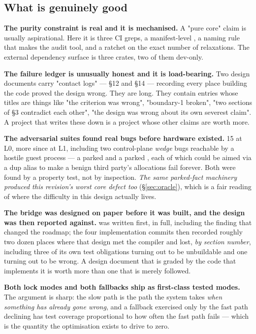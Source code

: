 \documentclass[10.5pt]{article}
\begin{document}
\subsection{What is genuinely good}

\textbf{The purity constraint is real and it is mechanised.} A "pure core" claim is usually
aspirational. Here it is three CI greps, a manifest-level , a naming rule that makes
 the audit tool, and a ratchet on the exact number of  relaxations. The
external dependency surface is three crates, two of them dev-only.

\textbf{The failure ledger is unusually honest and it is load-bearing.} Two design documents
carry "contact logs" —  \S12 and  \S14 — recording
every place building the code proved the design wrong. They are long. They contain entries whose
titles are things like "the criterion was wrong", "boundary-1 broken", "two sections of \S3
contradict each other", "the design was wrong about its own severest claim". A project that
writes these down is a project whose other claims are worth more.

\textbf{The adversarial suites found real bugs before hardware existed.} 15 at L0, more since at
L1, including two control-plane \emph{wedge} bugs reachable by a hostile guest process — a parked
 and a parked , each of which could be aimed
via a dup alias to make a benign third party's allocations fail forever. Both were found by a
property test, not by inspection. \emph{The same parked-fact machinery produced this revision's
worst core defect too} (\S\ref{sec:oracle}), which is a fair reading of where the difficulty in
this design actually lives.

\textbf{The bridge was designed on paper before it was built, and the design was then reported
against.}  was written first, in full, including the finding
that changed the roadmap; the four implementation commits then recorded roughly two dozen places where
that design met the compiler and lost, \emph{by section number}, including three of its own test
obligations turning out to be unbuildable and one turning out to be wrong. A design document that
is graded by the code that implements it is worth more than one that is merely followed.

\textbf{Both lock modes and both fallbacks ship as first-class tested modes.} The argument is
sharp: the slow path is the path the system takes \emph{when something has already gone wrong},
and a fallback exercised only by the fast path declining has test coverage proportional to how
often the fast path fails — which is the quantity the optimisation exists to drive to zero.
\end{document}

